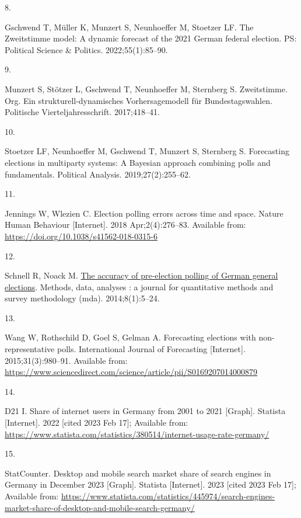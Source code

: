 \documentclass[
  letterpaper,
  DIV=11,
  numbers=noendperiod]{scrartcl}
\newlength{\cslhangindent}
\newlength{\csllabelwidth}
\newlength{\cslentryspacingunit} %
\newenvironment{CSLReferences}[2] %
 {%
  \setlength{\parindent}{0pt}
  \ifodd #1
  \let\oldpar\par
  \def\par{\hangindent=\cslhangindent\oldpar}
  \fi
  \setlength{\parskip}{#2\cslentryspacingunit}
 }%
 {}
\newcommand{\CSLLeftMargin}[1]{\parbox[t]{\csllabelwidth}{#1}}
\newcommand{\CSLRightInline}[1]{\parbox[t]{\linewidth - \csllabelwidth}{#1}\break}
\begin{document}
\begin{CSLReferences}{0}{0}
\leavevmode{}%
\CSLLeftMargin{8. }%
\CSLRightInline{Gschwend T, Müller K, Munzert S, Neunhoeffer M, Stoetzer
LF. The {Zweitstimme} model: {A} dynamic forecast of the 2021 {German}
federal election. PS: Political Science \& Politics. 2022;55(1):85--90.
}

\leavevmode{}%
\CSLLeftMargin{9. }%
\CSLRightInline{Munzert S, Stötzer L, Gschwend T, Neunhoeffer M,
Sternberg S. Zweitstimme. Org. {Ein} strukturell-dynamisches
{Vorhersagemodell} für {Bundestagswahlen}. Politische
Vierteljahresschrift. 2017;418--41. }

\leavevmode{}%
\CSLLeftMargin{10. }%
\CSLRightInline{Stoetzer LF, Neunhoeffer M, Gschwend T, Munzert S,
Sternberg S. Forecasting elections in multiparty systems: A {Bayesian}
approach combining polls and fundamentals. Political Analysis.
2019;27(2):255--62. }

\leavevmode{}%
\CSLLeftMargin{11. }%
\CSLRightInline{Jennings W, Wlezien C. Election polling errors across
time and space. Nature Human Behaviour {[}Internet{]}. 2018
Apr;2(4):276--83. Available from:
\url{https://doi.org/10.1038/s41562-018-0315-6}}

\leavevmode{}%
\CSLLeftMargin{12. }%
\CSLRightInline{Schnell R, Noack M.
\href{https://doi.org/10.12758/mda.2014.001}{The accuracy of
pre-election polling of {German} general elections}. Methods, data,
analyses : a journal for quantitative methods and survey methodology
(mda). 2014;8(1):5--24. }

\leavevmode{}%
\CSLLeftMargin{13. }%
\CSLRightInline{Wang W, Rothschild D, Goel S, Gelman A. Forecasting
elections with non-representative polls. International Journal of
Forecasting {[}Internet{]}. 2015;31(3):980--91. Available from:
\url{https://www.sciencedirect.com/science/article/pii/S0169207014000879}}

\leavevmode{}%
\CSLLeftMargin{14. }%
\CSLRightInline{D21 I. Share of internet users in {Germany} from 2001 to
2021 {[}{Graph}{]}. Statista {[}Internet{]}. 2022 {[}cited 2023 Feb
17{]}; Available from:
\url{https://www.statista.com/statistics/380514/internet-usage-rate-germany/}}

\leavevmode{}%
\CSLLeftMargin{15. }%
\CSLRightInline{StatCounter. Desktop and mobile search market share of
search engines in {Germany} in {December} 2023 {[}{Graph}{]}. Statista
{[}Internet{]}. 2023 {[}cited 2023 Feb 17{]}; Available from:
\url{https://www.statista.com/statistics/445974/search-engines-market-share-of-desktop-and-mobile-search-germany/}}


\end{CSLReferences}
\end{document}
